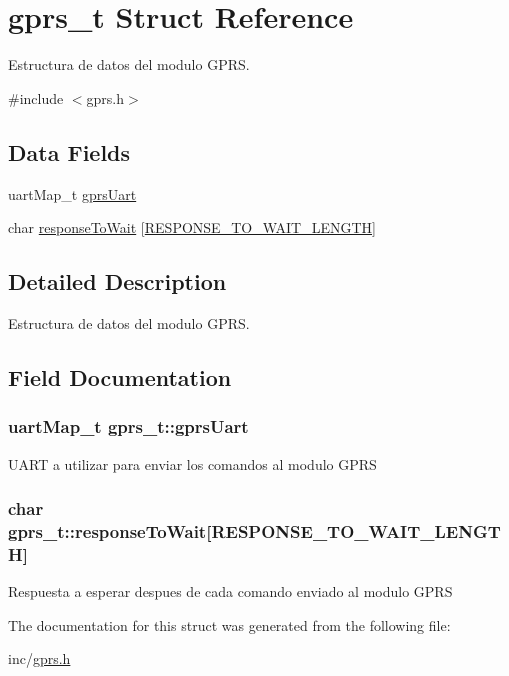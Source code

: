 \hypertarget{structgprs__t}{}\section{gprs\+\_\+t Struct Reference}
\label{structgprs__t}


Estructura de datos del modulo G\+P\+RS.  




{\ttfamily \#include $<$gprs.\+h$>$}

\subsection*{Data Fields}
\begin{DoxyCompactItemize}
\item 
uart\+Map\+\_\+t \hyperlink{structgprs__t_a3c84e9da5cece60ee4b43e40b25cce4a}{gprs\+Uart}
\item 
char \hyperlink{structgprs__t_aa975e09704ec26c258e58fa5f179c22b}{response\+To\+Wait} \mbox{[}\hyperlink{wifi__esp8266_8h_ad15d1691bb7dd8541f8f14974e5a94c6}{R\+E\+S\+P\+O\+N\+S\+E\+\_\+\+T\+O\+\_\+\+W\+A\+I\+T\+\_\+\+L\+E\+N\+G\+TH}\mbox{]}
\end{DoxyCompactItemize}


\subsection{Detailed Description}
Estructura de datos del modulo G\+P\+RS. 

\subsection{Field Documentation}
\subsubsection[{\texorpdfstring{gprs\+Uart}{gprsUart}}]{\setlength{\rightskip}{0pt plus 5cm}uart\+Map\+\_\+t gprs\+\_\+t\+::gprs\+Uart}\hypertarget{structgprs__t_a3c84e9da5cece60ee4b43e40b25cce4a}{}\label{structgprs__t_a3c84e9da5cece60ee4b43e40b25cce4a}
U\+A\+RT a utilizar para enviar los comandos al modulo G\+P\+RS 
\subsubsection[{\texorpdfstring{response\+To\+Wait}{responseToWait}}]{\setlength{\rightskip}{0pt plus 5cm}char gprs\+\_\+t\+::response\+To\+Wait\mbox{[}{\bf R\+E\+S\+P\+O\+N\+S\+E\+\_\+\+T\+O\+\_\+\+W\+A\+I\+T\+\_\+\+L\+E\+N\+G\+TH}\mbox{]}}\hypertarget{structgprs__t_aa975e09704ec26c258e58fa5f179c22b}{}\label{structgprs__t_aa975e09704ec26c258e58fa5f179c22b}
Respuesta a esperar despues de cada comando enviado al modulo G\+P\+RS 

The documentation for this struct was generated from the following file\+:\begin{DoxyCompactItemize}
\item 
inc/\hyperlink{gprs_8h}{gprs.\+h}\end{DoxyCompactItemize}
